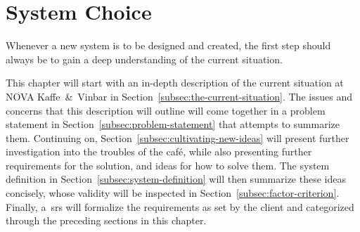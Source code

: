 \section{System Choice}\label{sec:system-choice}

Whenever a new system is to be designed and created, the first step should always be to gain a deep understanding of the
current situation.

This chapter will start with an in-depth description of the current situation at NOVA Kaffe~\&~Vinbar in
Section~\ref{subsec:the-current-situation}.
The issues and concerns that this description will outline will come together in a problem statement in
Section~\ref{subsec:problem-statement} that attempts to summarize them.
Continuing on, Section~\ref{subsec:cultivating-new-ideas} will present further investigation into the troubles of the
café, while also presenting further requirements for the solution, and ideas for how to solve them.
The system definition in Section~\ref{subsec:system-definition} will then summarize these ideas concisely, whose
validity will be inspected in Section~\ref{subsec:factor-criterion}.
Finally, a~\acrfull{srs} will formalize the requirements as set by the client and categorized through the preceding
sections in this chapter.







